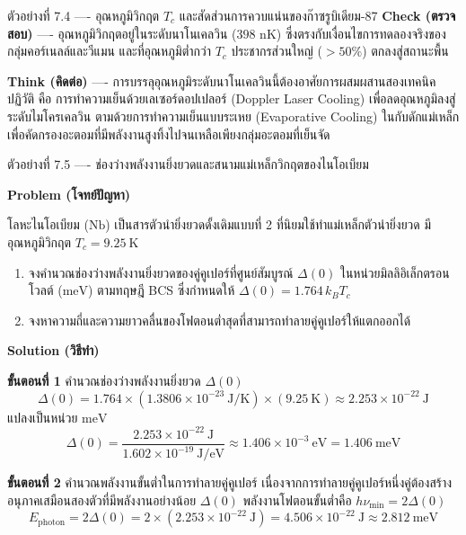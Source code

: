 \begin{psctbox}{ตัวอย่างที่ 7.4 ---- อุณหภูมิวิกฤต $T_c$ และสัดส่วนการควบแน่นของก๊าซรูบิเดียม-87}
\textbf{Check (ตรวจสอบ)} ---- อุณหภูมิวิกฤตอยู่ในระดับนาโนเคลวิน ($398\text{ nK}$) ซึ่งตรงกับเงื่อนไขการทดลองจริงของกลุ่มคอร์เนลล์และวีแมน และที่อุณหภูมิต่ำกว่า $T_c$ ประชากรส่วนใหญ่ ($> 50\%$) ตกลงสู่สถานะพื้น

\textbf{Think (คิดต่อ)} ---- การบรรลุอุณหภูมิระดับนาโนเคลวินนี้ต้องอาศัยการผสมผสานสองเทคนิคปฏิวัติ คือ การทำความเย็นด้วยเลเซอร์ดอปเปลอร์ (Doppler Laser Cooling) เพื่อลดอุณหภูมิลงสู่ระดับไมโครเคลวิน ตามด้วยการทำความเย็นแบบระเหย (Evaporative Cooling) ในกับดักแม่เหล็กเพื่อคัดกรองอะตอมที่มีพลังงานสูงทิ้งไปจนเหลือเพียงกลุ่มอะตอมที่เย็นจัด
\end{psctbox}

\begin{psctbox}{ตัวอย่างที่ 7.5 ---- ช่องว่างพลังงานยิ่งยวดและสนามแม่เหล็กวิกฤตของไนโอเบียม}

\textbf{Problem (โจทย์ปัญหา)}

โลหะไนโอเบียม ($\text{Nb}$) เป็นสารตัวนำยิ่งยวดดั้งเดิมแบบที่ 2 ที่นิยมใช้ทำแม่เหล็กตัวนำยิ่งยวด มีอุณหภูมิวิกฤต $T_c = 9.25~\text{K}$
\begin{enumerate}
    \item จงคำนวณช่องว่างพลังงานยิ่งยวดของคู่คูเปอร์ที่ศูนย์สัมบูรณ์ $\Delta(0)$ ในหน่วยมิลลิอิเล็กตรอนโวลต์ ($\text{meV}$) ตามทฤษฎี BCS ซึ่งกำหนดให้ $\Delta(0) = 1.764 \, k_B T_c$
    \item จงหาความถี่และความยาวคลื่นของโฟตอนต่ำสุดที่สามารถทำลายคู่คูเปอร์ให้แตกออกได้
\end{enumerate}

\textbf{Solution (วิธีทำ)}

\textbf{ขั้นตอนที่ 1} คำนวณช่องว่างพลังงานยิ่งยวด $\Delta(0)$
\begin{equation*}
\Delta(0) = 1.764 \times (1.3806 \times 10^{-23}~\text{J/K}) \times (9.25~\text{K}) \approx 2.253 \times 10^{-22}~\text{J}
\end{equation*}
แปลงเป็นหน่วย $\text{meV}$
\begin{equation*}
\Delta(0) = \frac{2.253 \times 10^{-22}~\text{J}}{1.602 \times 10^{-19}~\text{J/eV}} \approx 1.406 \times 10^{-3}~\text{eV} = 1.406~\text{meV}
\end{equation*}

\textbf{ขั้นตอนที่ 2} คำนวณพลังงานขั้นต่ำในการทำลายคู่คูเปอร์
เนื่องจากการทำลายคู่คูเปอร์หนึ่งคู่ต้องสร้างอนุภาคเสมือนสองตัวที่มีพลังงานอย่างน้อย $\Delta(0)$ พลังงานโฟตอนขั้นต่ำคือ $h\nu_{\text{min}} = 2\Delta(0)$
\begin{equation*}
E_{\text{photon}} = 2 \Delta(0) = 2 \times (2.253 \times 10^{-22}~\text{J}) = 4.506 \times 10^{-22}~\text{J} \approx 2.812~\text{meV}
\end{equation*}


\end{psctbox}
